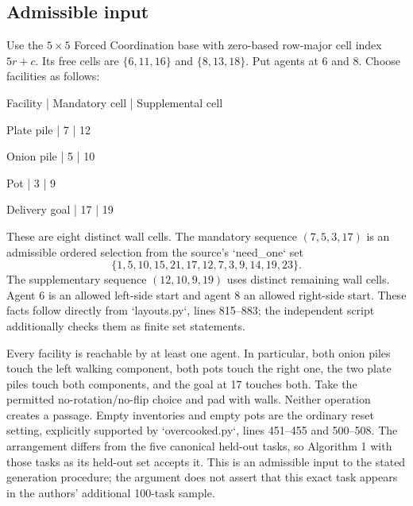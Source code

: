 \documentclass[10pt]{article}
\begin{document}
\subsection*{Admissible input}
Use the \(5\times5\) Forced Coordination base with zero-based row-major cell index \(5r+c\). Its free cells are \(\{6,11,16\}\) and \(\{8,13,18\}\). Put agents at 6 and 8. Choose facilities as follows:\par
Facility | Mandatory cell | Supplemental cell\par
Plate pile | 7 | 12\par
Onion pile | 5 | 10\par
Pot | 3 | 9\par
Delivery goal | 17 | 19\par
These are eight distinct wall cells. The mandatory sequence \((7,5,3,17)\) is an admissible ordered selection from the source’s `need\_one` set \[\{1,5,10,15,21,17,12,7,3,9,14,19,23\}.\] The supplementary sequence \((12,10,9,19)\) uses distinct remaining wall cells. Agent 6 is an allowed left-side start and agent 8 an allowed right-side start. These facts follow directly from `layouts.py`, lines 815–883; the independent script additionally checks them as finite set statements.\par
Every facility is reachable by at least one agent. In particular, both onion piles touch the left walking component, both pots touch the right one, the two plate piles touch both components, and the goal at 17 touches both. Take the permitted no-rotation/no-flip choice and pad with walls. Neither operation creates a passage. Empty inventories and empty pots are the ordinary reset setting, explicitly supported by `overcooked.py`, lines 451–455 and 500–508. The arrangement differs from the five canonical held-out tasks, so Algorithm 1 with those tasks as its held-out set accepts it. This is an admissible input to the stated generation procedure; the argument does not assert that this exact task appears in the authors’ additional 100-task sample.\par
\end{document}
